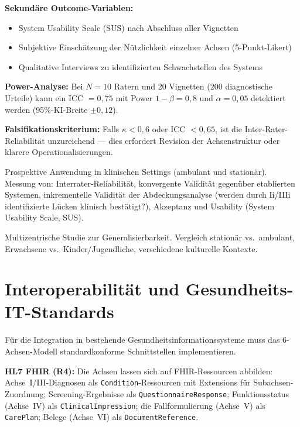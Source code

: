 \documentclass[11pt,a4paper]{article}
\begin{document}
\begin{description}[style=nextline, leftmargin=1.5cm, font=\bfseries]
\textbf{Sekund\"are Outcome-Variablen:}
\begin{itemize}[leftmargin=*, noitemsep]
    \item System Usability Scale (SUS) nach Abschluss aller Vignetten
    \item Subjektive Einsch\"atzung der Nützlichkeit einzelner Achsen (5-Punkt-Likert)
    \item Qualitative Interviews zu identifizierten Schwachstellen des Systems
\end{itemize}

\textbf{Power-Analyse:} Bei $N = 10$ Ratern und 20 Vignetten ($200$ diagnostische Urteile) kann ein ICC $= 0{,}75$ mit Power $1 - \beta = 0{,}8$ und $\alpha = 0{,}05$ detektiert werden (95\%-KI-Breite $\pm 0{,}12$).

\textbf{Falsifikationskriterium:} Falls $\kappa < 0{,}6$ oder ICC $< 0{,}65$, ist die Inter-Rater-Reliabilit\"at unzureichend --- dies erfordert Revision der Achsenstruktur oder klarere Operationalisierungen.

\item[Phase~3: Klinische Felderprobung (N=200+)] Prospektive Anwendung in klinischen Settings (ambulant und station\"ar). Messung von: Interrater-Reliabilit\"at, konvergente Validit\"at gegen\"uber etablierten Systemen, inkrementelle Validit\"at der Abdeckungsanalyse (werden durch Ii/IIIi identifizierte L\"ucken klinisch best\"atigt?), Akzeptanz und Usability (System Usability Scale, SUS).
\item[Phase~4: Multi-Site-Trial] Multizentrische Studie zur Generalisierbarkeit. Vergleich station\"ar vs.\ ambulant, Erwachsene vs.\ Kinder/Jugendliche, verschiedene kulturelle Kontexte.
\end{description}


\section{Interoperabilit\"at und Gesundheits-IT-Standards}
\label{sec:interop}

F\"ur die Integration in bestehende Gesundheitsinformationssysteme muss das 6-Achsen-Modell standardkonforme Schnittstellen implementieren.

\textbf{HL7 FHIR (R4):} Die Achsen lassen sich auf FHIR-Ressourcen abbilden: Achse~I/III-Diagnosen als \texttt{Condition}-Ressourcen mit Extensions f\"ur Subachsen-Zuordnung; Screening-Ergebnisse als \texttt{QuestionnaireResponse}; Funktionsstatus (Achse~IV) als \texttt{ClinicalImpression}; die Fallformulierung (Achse~V) als \texttt{CarePlan}; Belege (Achse~VI) als \texttt{DocumentReference}.
\end{document}
